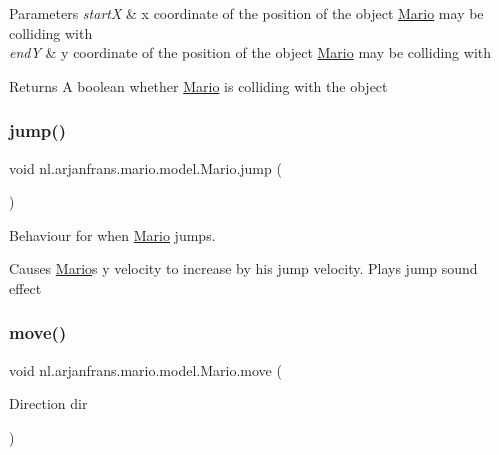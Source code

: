 \begin{DoxyParams}{Parameters}
{\em startX} & x coordinate of the position of the object \hyperlink{classnl_1_1arjanfrans_1_1mario_1_1model_1_1Mario}{Mario} may be colliding with \\
\hline
{\em endY} & y coordinate of the position of the object \hyperlink{classnl_1_1arjanfrans_1_1mario_1_1model_1_1Mario}{Mario} may be colliding with \\
\hline
\end{DoxyParams}
\begin{DoxyReturn}{Returns}
A boolean whether \hyperlink{classnl_1_1arjanfrans_1_1mario_1_1model_1_1Mario}{Mario} is colliding with the object 
\end{DoxyReturn}
\mbox{\label{classnl_1_1arjanfrans_1_1mario_1_1model_1_1Mario_aa31ff544aeab7ea01d0cdb54ba31a86b}} 
\subsubsection{\texorpdfstring{jump()}{jump()}}
{\footnotesize\ttfamily void nl.\+arjanfrans.\+mario.\+model.\+Mario.\+jump (\begin{DoxyParamCaption}{ }\end{DoxyParamCaption})\hspace{0.3cm}{\ttfamily [private]}}



Behaviour for when \hyperlink{classnl_1_1arjanfrans_1_1mario_1_1model_1_1Mario}{Mario} jumps. 

Causes \hyperlink{classnl_1_1arjanfrans_1_1mario_1_1model_1_1Mario}{Mario}\textquotesingle{}s y velocity to increase by his jump velocity. Plays jump sound effect \mbox{\label{classnl_1_1arjanfrans_1_1mario_1_1model_1_1Mario_a4d82e5956168d3222d122854a17300dd}} 
\subsubsection{\texorpdfstring{move()}{move()}}
{\footnotesize\ttfamily void nl.\+arjanfrans.\+mario.\+model.\+Mario.\+move (\begin{DoxyParamCaption}\item[{Direction}]{dir }\end{DoxyParamCaption})}



